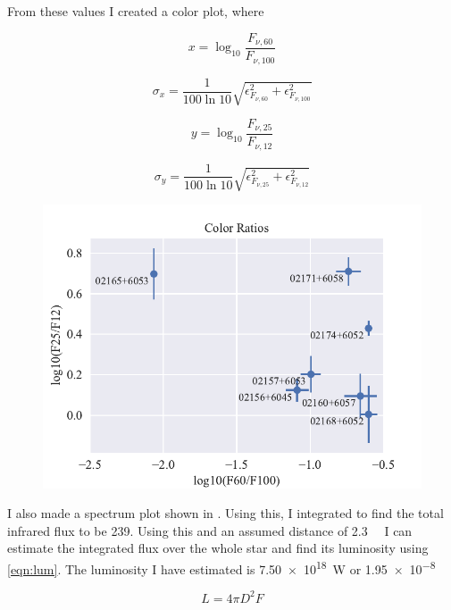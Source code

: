 \documentclass[]{article}
\begin{document}
From these values I created a color plot, where 

\begin{equation}
x = \log_{10}{\frac{F_{\nu, 60}}{F_{\nu, 100}}}
\end{equation}

\begin{equation}
\sigma_x = \frac{1}{100 \ln{10}}\sqrt{\epsilon_{F_{\nu,60}}^2 + \epsilon_{F_{\nu,100}}^2}
\end{equation}

\begin{equation}
y = \log_{10}{\frac{F_{\nu, 25}}{F_{\nu, 12}}}
\end{equation}

\begin{equation}
\sigma_y = \frac{1}{100 \ln{10}}\sqrt{\epsilon_{F_{\nu,25}}^2 + \epsilon_{F_{\nu,12}}^2}
\end{equation}

\begin{figure}[H]
	\centering
	\includegraphics[]{figs/colors.pdf}
\end{figure}

I also made a spectrum plot shown in . Using this, I integrated to find the total infrared flux to be \SI{239}{\jansky}. Using this and an assumed distance of \SI{2.3}{\kilo\pc} I can estimate the integrated flux over the whole star and find its luminosity using \autoref{eqn:lum}. The luminosity I have estimated is \SI{7.50e18}{\watt} or \SI{1.95e-8}{\solarlum}

\begin{equation}
L=4\pi D^2 F
\label{eqn:lum}
\end{equation}
\end{document}
